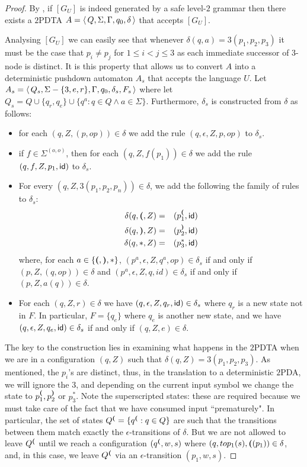 \begin{proof} By \cite{KNU02}, if $[G_U]$ is indeed generated by a safe level-$2$
grammar then there exists a $2$PDTA $A = \langle\,{Q, \Sigma,
\Gamma, q_0, \delta}\,\rangle $ that accepts $[G_U]$.

Analysing $[G_U]$ we can easily see that whenever $\delta(q, a) =
3(p_1, p_2, p_3)$ it must be the case that $p_i \not = p_j$ for $1
\leq i < j \leq 3$ as each immediate successor of $3$-node is
distinct. It is this property that allows us to convert $A$ into a
deterministic pushdown automaton $A_s$ that accepts the language
$U$. Let $A_s = \langle\,{Q_s, \Sigma - \{3,e,r\}, \Gamma, q_0,
\delta_s, F_s}\,\rangle$ where let $Q_s = Q \cup \{q_r, q_e\} \cup \{q^a :
q \in Q \wedge a \in \Sigma\}$. Furthermore, $\delta_s$ is
constructed from $\delta$ as follows:
\begin{itemize}
\item for each $(q, Z, (p,op)) \in \delta$ we add the rule $(q,
\epsilon, Z, p, op)$ to $\delta_s$. \item if $f \in
\Sigma^{(o,o)}$, then for each $(q, Z, f(p_1)) \in \delta$ we add
the rule $(q, f, Z, p_1, {\sf id})$ to $\delta_s$. \item For every $(q,
Z, 3(p_1, p_2, p_n)) \in \delta$, we add the following the family
of rules to $\delta_s$:
\begin{eqnarray}
\nonumber \delta(q, {\sf \textbf{(}}, Z) & = & (p_1^{{\sf \textbf{(}}}, {\sf id}) \\
\nonumber \delta(q, {\sf \textbf{)}}, Z) & = & (p_2^{{\sf \textbf{)}}}, {\sf id})\\
\nonumber \delta(q, \ast, Z) & = & (p_3^{\ast}, {\sf id})
\end{eqnarray}
where, for each $a \in \{{\sf \textbf{(}}, {\sf \textbf{)}}, \ast \}$,  $(p^a, \epsilon, Z, q^a,
op) \in \delta_s$ if and only if $(p, Z, (q, op)) \in \delta$ and
$(p^a, \epsilon, Z, q, id) \in \delta_s$ if and only if $(p, Z,
a(q)) \in \delta$. \item For each $(q, Z, r) \in \delta$ we have
$(q, \epsilon, Z, q_r, {\sf id}) \in \delta_s$ where $q_r$ is a new
state not in $F$. In particular, $F = \{q_e\}$ where $q_e$ is
another new state, and we have $(q, \epsilon, Z, q_e, {\sf id}) \in
\delta_s$ if and only if $(q, Z, e) \in \delta$.
\end{itemize}
The key to the construction lies in examining what happens in the
$2$PDTA when we are in a configuration $(q,Z)$ such that
$\delta(q,Z) = 3(p_1, p_2, p_3)$. As mentioned, the $p_i$'s are
distinct, thus, in the translation to
a deterministic $2$PDA, we will ignore the $3$, and depending on
the current input symbol we change the state to $p_1^{{\sf \textbf{(}}},
p_2^{{\sf \textbf{)}}}$ or $p_3^{\ast}$. Note the superscripted states: these are
required because we must take care of the fact that we have
consumed input ``prematurely". In particular, the set of states
$Q^{{\sf \textbf{(}}} = \{q^{{\sf \textbf{(}}} : q \in Q\}$ are such that the transitions
between them match exactly the $\epsilon$-transitions of $\delta$.
But we are not allowed to leave $Q^{{\sf \textbf{(}}}$ until we reach a
configuration $(q^{{\sf \textbf{(}}}, w, s)$ where $(q, top_1(s), {\sf \textbf{(}}(p_1)) \in
\delta$, and, in this case, we leave $Q^{{\sf \textbf{(}}}$ via an
$\epsilon$-transition $(p_1, w, s)$.
\end{proof}

